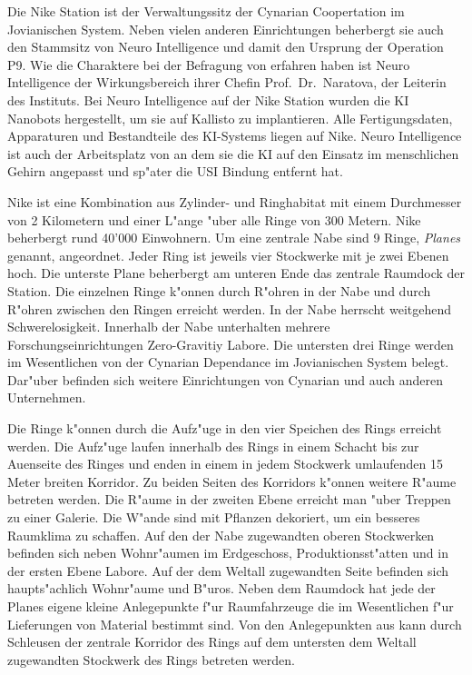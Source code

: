 
Die Nike Station ist der Verwaltungssitz der Cynarian Coopertation im Jovianischen System. Neben vielen anderen Einrichtungen beherbergt sie auch den Stammsitz von Neuro Intelligence und damit den Ursprung der Operation P9. Wie die Charaktere bei der Befragung von \ml{} erfahren haben ist Neuro Intelligence der Wirkungsbereich ihrer Chefin Prof.~Dr.~Naratova, der Leiterin des Instituts. Bei Neuro Intelligence auf der Nike Station wurden die KI Nanobots hergestellt, um sie auf Kallisto zu implantieren. Alle Fertigungsdaten, Apparaturen und Bestandteile des KI-Systems liegen auf Nike. Neuro Intelligence ist auch der Arbeitsplatz von \ml{} an dem sie die KI auf den Einsatz im menschlichen Gehirn angepasst und sp"ater die USI Bindung entfernt hat.

Nike ist eine Kombination aus Zylinder- und Ringhabitat mit einem Durchmesser von 2 Kilometern und einer L"ange "uber alle Ringe von 300 Metern. Nike beherbergt rund 40'000 Einwohnern. Um eine zentrale Nabe sind 9 Ringe, \emph{Planes} genannt, angeordnet. Jeder Ring ist jeweils vier Stockwerke mit je zwei Ebenen hoch. Die unterste Plane beherbergt am unteren Ende das zentrale Raumdock der Station.  Die einzelnen Ringe k"onnen durch R"ohren in der Nabe und durch R"ohren zwischen den Ringen erreicht werden. In der Nabe herrscht weitgehend Schwerelosigkeit. Innerhalb der Nabe unterhalten mehrere Forschungseinrichtungen Zero-Gravitiy Labore. Die untersten drei Ringe werden im Wesentlichen von der Cynarian Dependance im Jovianischen System belegt. Dar"uber befinden sich weitere Einrichtungen von Cynarian und auch anderen Unternehmen.

Die Ringe k"onnen durch die Aufz"uge in den vier Speichen des Rings erreicht werden. Die Aufz"uge laufen innerhalb des Rings in einem Schacht bis zur Au\3enseite des Ringes und enden in einem in jedem Stockwerk umlaufenden 15 Meter breiten Korridor. Zu beiden Seiten des Korridors k"onnen weitere R"aume betreten werden. Die R"aume in der zweiten Ebene erreicht man "uber Treppen zu einer Galerie. Die W"ande sind mit Pflanzen dekoriert, um ein besseres Raumklima zu schaffen. Auf den der Nabe zugewandten oberen Stockwerken befinden sich neben Wohnr"aumen im Erdgeschoss, Produktionsst"atten und in der ersten Ebene Labore. Auf der dem Weltall zugewandten Seite befinden sich haupts"achlich Wohnr"aume und B"uros. Neben dem Raumdock hat jede der Planes eigene kleine Anlegepunkte f"ur Raumfahrzeuge die im Wesentlichen f"ur Lieferungen von Material bestimmt sind. Von den Anlegepunkten aus kann durch Schleusen der zentrale Korridor des Rings auf dem untersten dem Weltall zugewandten Stockwerk des Rings betreten werden.

